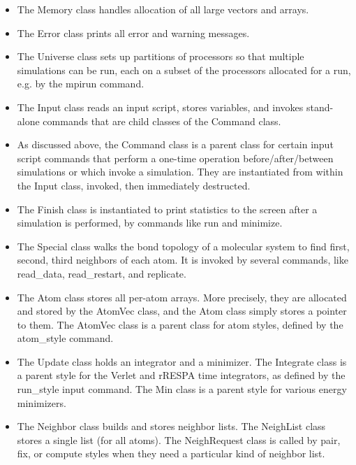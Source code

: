 \documentclass{article}
\begin{document}
\begin{itemize}

\item The Memory class handles allocation of all large vectors and
  arrays.

\item The Error class prints all error and warning messages.

\item The Universe class sets up partitions of processors so that
  multiple simulations can be run, each on a subset of the processors
  allocated for a run, e.g. by the mpirun command.

\item The Input class reads an input script, stores variables, and
  invokes stand-alone commands that are child classes of the Command
  class.

\item As discussed above, the Command class is a parent class for
  certain input script commands that perform a one-time operation
  before/after/between simulations or which invoke a simulation.  They
  are instantiated from within the Input class, invoked, then
  immediately destructed.

\item The Finish class is instantiated to print statistics to the
  screen after a simulation is performed, by commands like run and
  minimize.

\item The Special class walks the bond topology of a molecular system
  to find first, second, third neighbors of each atom.  It is invoked by
  several commands, like read\_data, read\_restart, and replicate.

\item The Atom class stores all per-atom arrays.  More precisely, they
  are allocated and stored by the AtomVec class, and the Atom class
  simply stores a pointer to them.  The AtomVec class is a parent
  class for atom styles, defined by the atom\_style command.

\item The Update class holds an integrator and a minimizer.  The
  Integrate class is a parent style for the Verlet and rRESPA time
  integrators, as defined by the run\_style input command.  The Min
  class is a parent style for various energy minimizers.

\item The Neighbor class builds and stores neighbor lists.  The
  NeighList class stores a single list (for all atoms).  The
  NeighRequest class is called by pair, fix, or compute styles when
  they need a particular kind of neighbor list.


\end{itemize}
\end{document}
